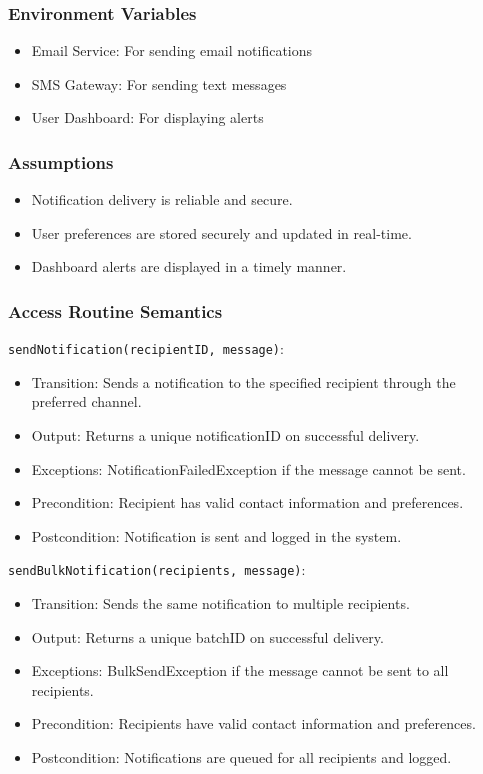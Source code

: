 \documentclass[12pt, titlepage]{article}
\begin{document}
\subsubsection{Environment Variables}
\begin{itemize}
    \item Email Service: For sending email notifications
    \item SMS Gateway: For sending text messages
    \item User Dashboard: For displaying alerts
\end{itemize}

\subsubsection{Assumptions}
\begin{itemize}
    \item Notification delivery is reliable and secure.
    \item User preferences are stored securely and updated in real-time.
    \item Dashboard alerts are displayed in a timely manner.
\end{itemize}

\subsubsection{Access Routine Semantics}
\noindent \texttt{sendNotification(recipientID, message)}:
\begin{itemize}
    \item Transition: Sends a notification to the specified recipient through the preferred channel.
    \item Output: Returns a unique notificationID on successful delivery.
    \item Exceptions: NotificationFailedException if the message cannot be sent.
    \item Precondition: Recipient has valid contact information and preferences.
    \item Postcondition: Notification is sent and logged in the system.
\end{itemize}

\noindent \texttt{sendBulkNotification(recipients, message)}:
\begin{itemize}
    \item Transition: Sends the same notification to multiple recipients.
    \item Output: Returns a unique batchID on successful delivery.
    \item Exceptions: BulkSendException if the message cannot be sent to all recipients.
    \item Precondition: Recipients have valid contact information and preferences.
    \item Postcondition: Notifications are queued for all recipients and logged.
\end{itemize}
\end{document}
